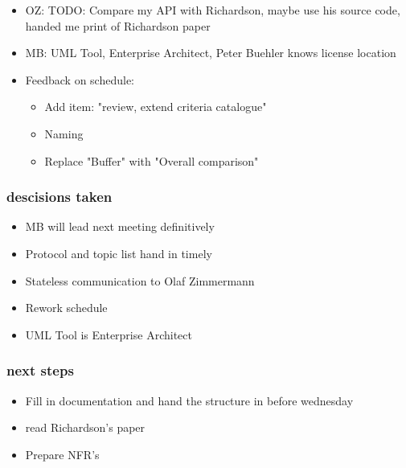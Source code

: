 \documentclass{article}
\begin{document}
\begin{itemize}
\begin{itemize}
        \end{itemize}
    \item OZ: TODO: Compare my API with Richardson, maybe use his source code, handed me print of Richardson paper
    \item MB: UML Tool, Enterprise Architect, Peter Buehler knows license location
    \item Feedback on schedule:
        \begin{itemize}
            \item Add item: "review, extend criteria catalogue"
            \item Naming
            \item Replace "Buffer" with "Overall comparison"
        \end{itemize}
\end{itemize}

\subsubsection{descisions taken}
\begin{itemize}
    \item MB will lead next meeting definitively
    \item Protocol and topic list hand in timely
    \item Stateless communication to Olaf Zimmermann
    \item Rework schedule
    \item UML Tool is Enterprise Architect
\end{itemize}

\subsubsection{next steps}
\begin{itemize}
    \item Fill in documentation and hand the structure in before wednesday
    \item read Richardson's paper
    \item Prepare NFR's
\end{itemize}
\end{document}
